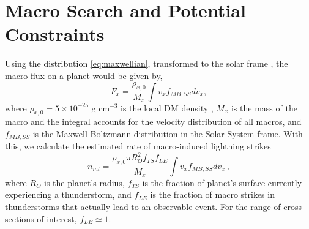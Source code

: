 \documentclass[%
 reprint,
 amsmath,amssymb,
 aps,
 nofootinbib, %
]{revtex4-2}
\begin{document}



\section{Macro Search and Potential Constraints}  %
\label{sec:macro_search_and_constraints}

    Using the distribution \eqref{eq:maxwellian}, transformed to the solar frame \citep{Freese2013}, the macro flux on a planet would be given by,
    \begin{equation}\label{eq:planet_macro_flux}
        F_{x} = \frac{\rho_{x,0}}{M_{x}} \int v_{x} f_{MB,SS} dv_x,
    \end{equation}
    where $\rho_{x,0} = 5 \times 10^{-25}$ g cm$^{-3}$ is the local DM density \citep{Bovy2012}, $M_{x}$ is the mass of the macro and the integral accounts for the velocity distribution of all macros, and $f_{MB,SS}$ is the Maxwell Boltzmann distribution in the Solar System frame. With this, we calculate the estimated rate of macro-induced lightning strikes
    \begin{equation}\label{eq:macro_lightning_rate}
        n_{ml} = \frac{\rho_{x,0} \pi R_{O}^2 f_{TS} f_{LE}}{M_{x}}\int v_{x} f_{MB,SS} dv_x\,,
    \end{equation}
    where $R_{O}$ is the planet's radius, $f_{TS}$ is the fraction of planet's surface currently experiencing a thunderstorm, and $f_{LE}$ is the fraction of macro strikes in thunderstorms that actually lead to an observable event. For the range of cross-sections of interest, $f_{LE}\simeq1$.
\end{document}
